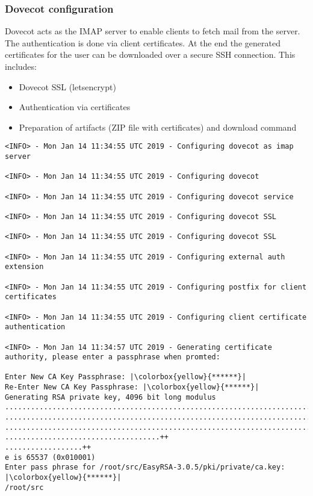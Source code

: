  \subsubsection{Dovecot configuration}
 Dovecot acts as the \gls{IMAP} server to enable clients to fetch mail from the server. 
The authentication is done via client certificates. 
At the end the generated certificates for the user can be downloaded over a secure SSH connection. This includes:
 \begin{itemize}
     \item{Dovecot \gls{SSL} (letsencrypt)}
     \item{Authentication via certificates}
     \item{Preparation of artifacts (ZIP file with certificates) and download command}
 \end{itemize} 
 \begin{lstlisting}[escapeinside=||]    
<INFO> - Mon Jan 14 11:34:55 UTC 2019 - Configuring dovecot as imap server

<INFO> - Mon Jan 14 11:34:55 UTC 2019 - Configuring dovecot

<INFO> - Mon Jan 14 11:34:55 UTC 2019 - Configuring dovecot service

<INFO> - Mon Jan 14 11:34:55 UTC 2019 - Configuring dovecot SSL

<INFO> - Mon Jan 14 11:34:55 UTC 2019 - Configuring dovecot SSL

<INFO> - Mon Jan 14 11:34:55 UTC 2019 - Configuring external auth extension

<INFO> - Mon Jan 14 11:34:55 UTC 2019 - Configuring postfix for client certificates

<INFO> - Mon Jan 14 11:34:55 UTC 2019 - Configuring client certificate authentication

<INFO> - Mon Jan 14 11:34:57 UTC 2019 - Generating certificate authority, please enter a passphrase when promted:

Enter New CA Key Passphrase: |\colorbox{yellow}{******}|
Re-Enter New CA Key Passphrase: |\colorbox{yellow}{******}|
Generating RSA private key, 4096 bit long modulus
........................................................................
........................................................................
........................................................................
....................................++                                                                               
..................++
e is 65537 (0x010001)
Enter pass phrase for /root/src/EasyRSA-3.0.5/pki/private/ca.key: |\colorbox{yellow}{******}|
/root/src


\end{lstlisting}
